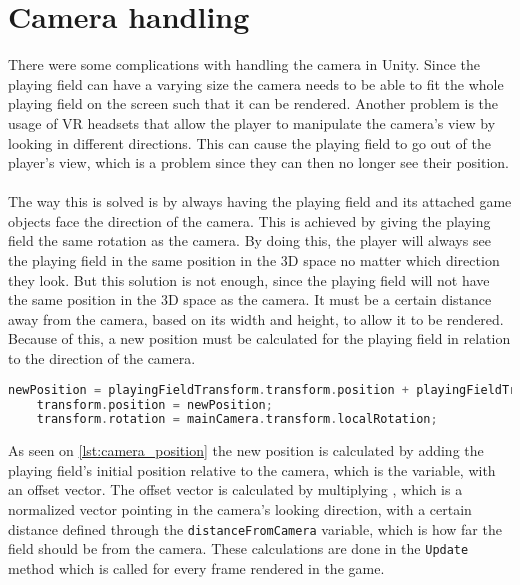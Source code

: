 \section{Camera handling}
There were some complications with handling the camera in Unity.
Since the playing field can have a varying size the camera needs to be able to fit the whole playing field on the screen such that it can be rendered.
Another problem is the usage of VR headsets that allow the player to manipulate the camera's view by looking in different directions.
This can cause the playing field to go out of the player's view, which is a problem since they can then no longer see their position.
\\\\
The way this is solved is by always having the playing field and its attached game objects face the direction of the camera.
This is achieved by giving the playing field the same rotation as the camera.
By doing this, the player will always see the playing field in the same position in the 3D space no matter which direction they look.
But this solution is not enough, since the playing field will not have the same position in the 3D space as the camera.
It must be a certain distance away from the camera, based on its width and height, to allow it to be rendered. 
Because of this, a new position must be calculated for the playing field in relation to the direction of the camera. 
\begin{lstlisting}[caption={Calculating and setting the position and rotation of the playing field}, captionpos=b,language=C,label={lst:camera_position}]
    newPosition = playingFieldTransform.transform.position + playingFieldTransform.transform.forward * distanceFromCamera;
    transform.position = newPosition;
    transform.rotation = mainCamera.transform.localRotation; 
\end{lstlisting}
As seen on \autoref{lst:camera_position} the new position is calculated by adding the playing field's initial position relative to the camera, which is the  variable, with an offset vector.
The offset vector is calculated by multiplying , which is a normalized vector pointing in the camera's looking direction, with a certain distance defined through the \texttt{distanceFromCamera} variable, which is how far the field should be from the camera.
These calculations are done in the \texttt{Update} method which is called for every frame rendered in the game.
\\\\
